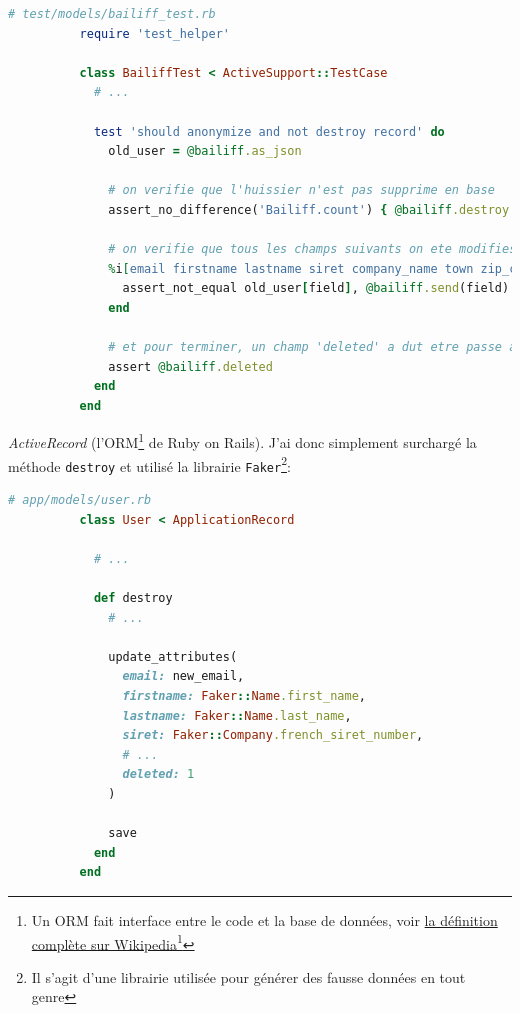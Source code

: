 \documentclass[]{report}
\newcommand\fnurl[2]{%
  \href{#1}{#2}\footnote{\url{#1}}%
}
\begin{document}
        \begin{scriptsize}
          \begin{lstlisting}[language=ruby]
          # test/models/bailiff_test.rb
          require 'test_helper'

          class BailiffTest < ActiveSupport::TestCase
            # ...

            test 'should anonymize and not destroy record' do
              old_user = @bailiff.as_json

              # on verifie que l'huissier n'est pas supprime en base
              assert_no_difference('Bailiff.count') { @bailiff.destroy }

              # on verifie que tous les champs suivants on ete modifies
              %i[email firstname lastname siret company_name town zip_code address_2 address_1].each do |field|
                assert_not_equal old_user[field], @bailiff.send(field)
              end

              # et pour terminer, un champ 'deleted' a dut etre passe a 'true'
              assert @bailiff.deleted
            end
          end
          \end{lstlisting}
        \end{scriptsize}


        \textit{ActiveRecord} (l'ORM\footnote{Un ORM fait interface entre le code et la base de données, voir \fnurl{https://fr.wikipedia.org/wiki/Mapping_objet-relationnel}{la définition complète sur Wikipedia}} de Ruby on Rails). J'ai donc simplement surchargé la méthode \verb|destroy| et utilisé la librairie \verb|Faker|\footnote{Il s'agit d'une librairie utilisée pour générer des fausse données en tout genre}:

        \begin{scriptsize}
          \begin{lstlisting}[language=ruby]
          # app/models/user.rb
          class User < ApplicationRecord

            # ...

            def destroy
              # ...

              update_attributes(
                email: new_email,
                firstname: Faker::Name.first_name,
                lastname: Faker::Name.last_name,
                siret: Faker::Company.french_siret_number,
                # ...
                deleted: 1
              )

              save
            end
          end
          \end{lstlisting}
        \end{scriptsize}
\end{document}
